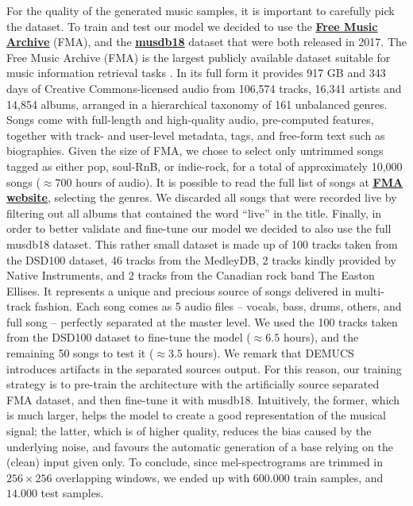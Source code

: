 \documentclass[journal]{IEEEtran}
\begin{document}
For the quality of the generated music samples, it is important to carefully pick the dataset. To train and test our model we decided to use the 
\underline{\textbf{\href{https://github.com/mdeff/fma}{Free Music Archive}}} (FMA), and the 
\underline{\textbf{\href{https://sigsep.github.io/datasets/musdb.html}{musdb18}}} dataset \cite{musdb18} that were both released in 2017. The Free Music Archive (FMA) is the largest publicly available dataset suitable for music information retrieval tasks \cite{fma_challenge}. In its full form it provides 917 GB and 343 days of Creative Commons-licensed audio from 106,574 tracks, 16,341 artists and 14,854 albums, arranged in a hierarchical taxonomy of 161 unbalanced genres. Songs come with full-length and high-quality audio, pre-computed features, together with track- and user-level metadata, tags, and free-form text such as biographies. Given the size of FMA, we chose to select only untrimmed songs tagged as either pop, soul-RnB, or indie-rock, for a total of approximately 10,000 songs ($\approx700$ hours of audio). It is possible to read the full list of songs at \underline{\textbf{\href{https://freemusicarchive.org/home}{FMA website}}}, selecting the genres. We discarded all songs that were recorded live by filtering out all albums that contained the word ``live'' in the title. Finally, in order to better validate and fine-tune our model we decided to also use the full musdb18 dataset. This rather small dataset is made up of 100 tracks taken from the DSD100 dataset, 46 tracks from the MedleyDB, 2 tracks kindly provided by Native Instruments, and 2 tracks from the Canadian rock band The Easton Ellises. It represents a unique and precious source of songs delivered in multi-track fashion. Each song comes as 5 audio files -- vocals, bass, drums, others, and full song -- perfectly separated at the master level. We used the 100 tracks taken from the DSD100 dataset to fine-tune the model ($\approx 6.5$ hours), and the remaining 50 songs to test it ($\approx3.5$ hours). We remark that DEMUCS introduces artifacts in the separated sources output. For this reason, our training strategy is to pre-train the architecture with the artificially source separated FMA dataset, and then fine-tune it with musdb18. Intuitively, the former, which is much larger, helps the model to create a good representation of the musical signal; the latter, which is of higher quality, %
reduces the bias caused by the underlying noise, and favours the automatic generation of a base relying on the (clean) input given only. To conclude, since mel-spectrograms are trimmed in $256\times256$ overlapping windows, we ended up with $600.000$ train samples, and $14.000$ test samples.
\end{document}
